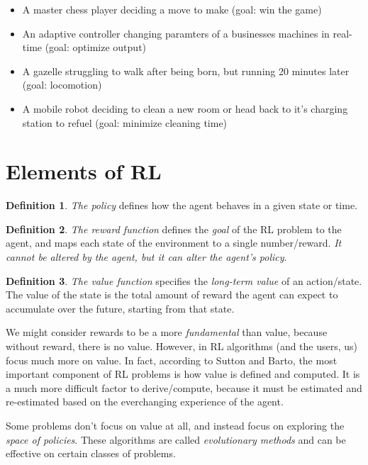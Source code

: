 \documentclass[11pt]{article}
\theoremstyle{definition}
\newtheorem{definition}{Definition}
\begin{document}
\begin{itemize}
    \item A master chess player deciding a move to make (goal: win the game)
    \item An adaptive controller changing paramters of a businesses machines in real-time (goal: optimize output)
    \item A gazelle struggling to walk after being born, but running 20 minutes later (goal: locomotion)
    \item A mobile robot deciding to clean a new room or head back to it's charging station to refuel (goal: minimize cleaning time)
\end{itemize}

\section*{\textcolor{CalPolyGreen}{Elements of RL}}

\begin{definition}
\textit{The policy} defines how the agent behaves in a given state or time.
\end{definition}

\begin{definition}
\textit{The reward function} defines the \textit{goal} of the RL problem to the agent, and maps each state of the environment to a single number/reward. \textit{It cannot be altered by the agent, but it can alter the agent's policy}.
\end{definition}

\begin{definition}
\textit{The value function} specifies the \textit{long-term value} of an action/state. The value of the state is the total amount of reward the agent can expect to accumulate over the future, starting from that state.
\end{definition}

We might consider rewards to be a more \textit{fundamental} than value, because without reward, there is no value. However, in RL algorithms (and the users, us) focus much more on value. In fact, according to Sutton and Barto, the most important component of RL problems is how value is defined and computed. It is a much more difficult factor to derive/compute, because it must be estimated and re-estimated based on the everchanging experience of the agent.

Some problems don't focus on value at all, and instead focus on exploring the \textit{space of policies}. These algorithms are called \textit{evolutionary methods} and can be effective on certain classes of problems.
\end{document}
